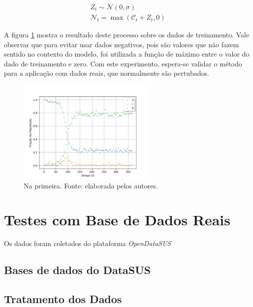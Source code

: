 \begin{eqnarray}\label{eq:ruido-gaussiano}
    Z_t \sim \mathcal{N}(0, \sigma) \\
    \mathcal{N}_t = \max(\mathcal{C}_t + Z_t, 0)  
\end{eqnarray}

A figura \ref{fig:dados-comruido} mostra o resultado deste processo sobre os dados
de treinamento. Vale observar que para evitar usar dados negativos, pois são valores
que não fazem sentido no contexto do modelo, foi utilizada a função de máximo
entre o valor do dado de treinamento e zero.
Com este experimento, espera-se validar o método para a aplicação com dados reais,
que normalmente são pertubados. 

\begin{figure}[htpb]
\centering
\includegraphics[width=0.6\textwidth]{figuras/runge-kutta-compartiments-data-sir-noisy.png}
\caption{Na primeira. Fonte: elaborada pelos autores.}
\label{fig:dados-comruido}
\end{figure}


\section{Testes com Base de Dados Reais}

Os dados foram coletados do plataforma \textit{OpenDataSUS} \cite{opendatasus}


\subsection{Bases de dados do DataSUS}

\subsection{Tratamento dos Dados}

